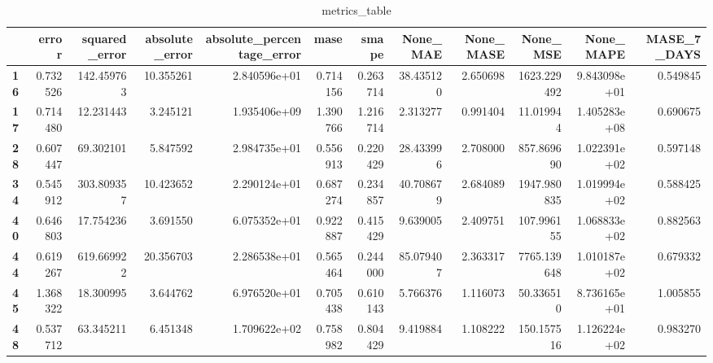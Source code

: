 \begin{table}[h]
\centering
\caption{metrics_table}
\label{table:PRedict ok-variance dataset with lstm}
\begin{tabular}{lrrrrrrrrrrr}
\toprule
{} &     error &  squared\_error &  absolute\_error &  absolute\_percentage\_error &      mase &     smape &   None\_MAE &  None\_MASE &     None\_MSE &     None\_MAPE &  MASE\_7\_DAYS \\
\midrule
\textbf{16} &  0.732526 &     142.459763 &       10.355261 &               2.840596e+01 &  0.714156 &  0.263714 &  38.435120 &   2.650698 &  1623.229492 &  9.843098e+01 &     0.549845 \\
\textbf{17} &  0.714480 &      12.231443 &        3.245121 &               1.935406e+09 &  1.390766 &  1.216714 &   2.313277 &   0.991404 &    11.019944 &  1.405283e+08 &     0.690675 \\
\textbf{28} &  0.607447 &      69.302101 &        5.847592 &               2.984735e+01 &  0.556913 &  0.220429 &  28.433996 &   2.708000 &   857.869690 &  1.022391e+02 &     0.597148 \\
\textbf{34} &  0.545912 &     303.809357 &       10.423652 &               2.290124e+01 &  0.687274 &  0.234857 &  40.708679 &   2.684089 &  1947.980835 &  1.019994e+02 &     0.588425 \\
\textbf{40} &  0.646803 &      17.754236 &        3.691550 &               6.075352e+01 &  0.922887 &  0.415429 &   9.639005 &   2.409751 &   107.996155 &  1.068833e+02 &     0.882563 \\
\textbf{44} &  0.619267 &     619.669922 &       20.356703 &               2.286538e+01 &  0.565464 &  0.244000 &  85.079407 &   2.363317 &  7765.139648 &  1.010187e+02 &     0.679332 \\
\textbf{45} &  1.368322 &      18.300995 &        3.644762 &               6.976520e+01 &  0.705438 &  0.610143 &   5.766376 &   1.116073 &    50.336510 &  8.736165e+01 &     1.005855 \\
\textbf{48} &  0.537712 &      63.345211 &        6.451348 &               1.709622e+02 &  0.758982 &  0.804429 &   9.419884 &   1.108222 &   150.157516 &  1.126224e+02 &     0.983270 \\
\bottomrule
\end{tabular}
\end{table}
